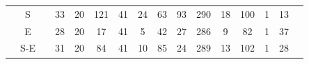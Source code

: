 \documentclass[12pt,bibliography=oldstyle,DIV=12,parskip=half-]{scrreprt}
\begin{document}
\begin{table}[h]
\begin{tabular}{@{}ccc@{}SSSSSSSSSSSSS@{}}
    \midrule
&{S}  &&   33 & 20&  121 &    41 &    24 &    63 &    93 &   290 &    18 &   100 &     1 &    13 \\
&{E}  &&   28 & 20&   17 &    41 &     5 &    42 &    27 &   286 &     9 &    82 &     1 &    37 \\
&{S-E}&&   31 & 20&   84 &    41 &    10 &    85 &    24 &   289 &    13 &   102 &     1 &    28 \\

\end{tabular}
\end{table}
\end{document}
